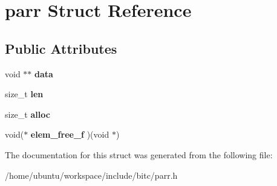 \hypertarget{structparr}{\section{parr Struct Reference}
\label{structparr}
}
\subsection*{Public Attributes}
\begin{DoxyCompactItemize}
\item 
\hypertarget{structparr_ac2748012d9ba7df09a7ef5f03d3b4adc}{void $\ast$$\ast$ {\bfseries data}}\label{structparr_ac2748012d9ba7df09a7ef5f03d3b4adc}

\item 
\hypertarget{structparr_af645d03435eec05c1d20d4fe96409dd0}{size\-\_\-t {\bfseries len}}\label{structparr_af645d03435eec05c1d20d4fe96409dd0}

\item 
\hypertarget{structparr_a2bf4df17c7ab43c209af6dfa093096c0}{size\-\_\-t {\bfseries alloc}}\label{structparr_a2bf4df17c7ab43c209af6dfa093096c0}

\item 
\hypertarget{structparr_aaf9af52d3c08f00dfda37c53e4a7e5c9}{void($\ast$ {\bfseries elem\-\_\-free\-\_\-f} )(void $\ast$)}\label{structparr_aaf9af52d3c08f00dfda37c53e4a7e5c9}

\end{DoxyCompactItemize}


The documentation for this struct was generated from the following file\-:\begin{DoxyCompactItemize}
\item 
/home/ubuntu/workspace/include/bitc/parr.\-h\end{DoxyCompactItemize}
